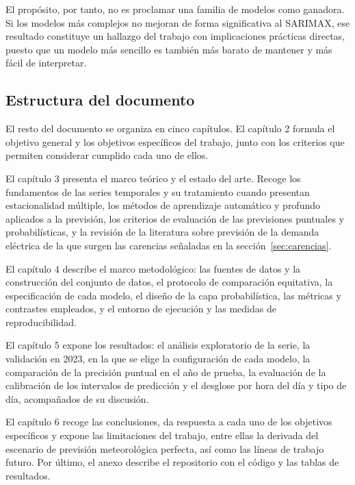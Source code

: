 El propósito, por tanto, no es proclamar una familia de modelos como
ganadora. Si los modelos más complejos no mejoran de forma significativa al
SARIMAX, ese resultado constituye un hallazgo del trabajo con implicaciones
prácticas directas, puesto que un modelo más sencillo es también más barato de
mantener y más fácil de interpretar.

\subsection{Estructura del documento}\label{sec:estructura}

El resto del documento se organiza en cinco capítulos. El capítulo 2 formula
el objetivo general y los objetivos específicos del trabajo, junto con los
criterios que permiten considerar cumplido cada uno de ellos.

El capítulo 3 presenta el marco teórico y el estado del arte. Recoge los
fundamentos de las series temporales y su tratamiento cuando presentan
estacionalidad múltiple, los métodos de aprendizaje automático y profundo
aplicados a la previsión, los criterios de evaluación de las previsiones
puntuales y probabilísticas, y la revisión de la literatura sobre previsión de
la demanda eléctrica de la que surgen las carencias señaladas en la
sección~\ref{sec:carencias}.

El capítulo 4 describe el marco metodológico: las fuentes de datos y la
construcción del conjunto de datos, el protocolo de comparación equitativa, la
especificación de cada modelo, el diseño de la capa probabilística, las
métricas y contrastes empleados, y el entorno de ejecución y las medidas de
reproducibilidad.

El capítulo 5 expone los resultados: el análisis exploratorio de la serie, la
validación en 2023, en la que se elige la configuración de cada modelo, la
comparación de la precisión puntual en el año de prueba, la evaluación de la calibración de los
intervalos de predicción y el desglose por hora del día y tipo de día,
acompañados de su discusión.

El capítulo 6 recoge las conclusiones, da respuesta a cada uno de los
objetivos específicos y expone las limitaciones del trabajo, entre ellas la
derivada del escenario de previsión meteorológica perfecta, así como las
líneas de trabajo futuro. Por último, el anexo describe el repositorio con el
código y las tablas de resultados.
